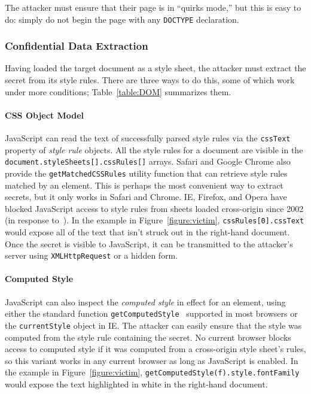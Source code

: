 \documentclass{acm_proc_article-sp}
\begin{document}
The attacker must ensure that their page is in “quirks mode,” but this
is easy to do: simply do not begin the page with any \verb|DOCTYPE|
declaration.%

\subsubsection{Confidential Data Extraction}\label{sec:extraction}
Having loaded the target document as a style sheet, the attacker must
extract the secret from its style rules. There are three ways to do
this, some of which work under more conditions; Table~\ref{table:DOM}
summarizes them.

\paragraph{CSS Object Model}
JavaScript can read the text of successfully parsed style rules via
the \texttt{cssText} property of \emph{style rule} objects.  All the
style rules for a document are visible in the
\texttt{document.styleSheets[].cssRules[]} arrays.  Safari and Google
Chrome also provide the \texttt{getMatchedCSSRules} utility function
that can retrieve style rules matched by an element.  This is perhaps
the most convenient way to extract secrets, but it only works in
Safari and Chrome.  IE, Firefox, and Opera have blocked JavaScript
access to style rules from sheets loaded cross-origin since 2002 (in
response to~\cite{cssxss02}).  In the example in
Figure~\ref{figure:victim}, \texttt{cssRules[0].cssText} would expose
all of the text that isn't struck out in the right-hand document.
Once the secret is visible to JavaScript, it can be transmitted to the
attacker's server using \texttt{XMLHttpRequest} or a hidden form.

\paragraph{Computed Style}
JavaScript can also inspect the \emph{computed style} in effect for an
element, using either the standard function
\texttt{getComputedStyle}~\cite{domcss} supported in most browsers or
the \texttt{currentStyle} object in IE.  The attacker can easily
ensure that the style was computed from the style rule containing the
secret.  No current browser blocks access to computed style if it was
computed from a cross-origin style sheet's rules, so this variant
works in any current browser as long as JavaScript is enabled.  In the
example in Figure~\ref{figure:victim},
\texttt{getComputedStyle(f).style.fontFamily} would expose the text
highlighted in white in the right-hand document.
\end{document}
